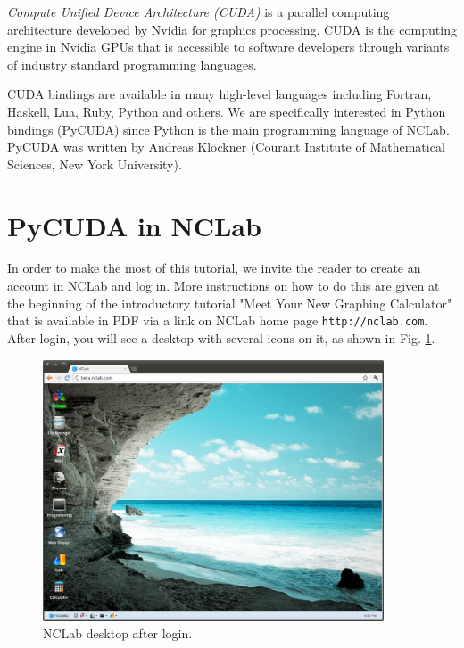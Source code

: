 \documentclass{article}
\begin{document}
{\em Compute Unified Device Architecture (CUDA)} is a parallel computing architecture 
developed by Nvidia for graphics processing. CUDA is the computing engine in 
Nvidia GPUs that is accessible to software developers through variants of 
industry standard programming languages.

CUDA bindings are available in many high-level languages including Fortran,
Haskell, Lua, Ruby, Python and others. We are specifically interested 
in Python bindings (PyCUDA) since Python is the main programming language 
of NCLab. PyCUDA was written by Andreas Kl\"ockner (Courant Institute 
of Mathematical Sciences, New York University).





\section{PyCUDA in NCLab}

In order to make the most of this tutorial, we invite the 
reader to create an account in NCLab and log in. More instructions 
on how to do this are given at the beginning of the introductory 
tutorial "Meet Your New Graphing Calculator" that is available in 
PDF via a link on NCLab home page {\tt http://nclab.com}. \\

\noindent
After login, you will see a desktop with several icons on it,
as shown in Fig. \ref{fig:desktop}. 

\begin{figure}[!ht]
\begin{center}
\includegraphics[width=0.9\textwidth]{img/desktop.png}
\end{center}
\caption{NCLab desktop after login.}
\label{fig:desktop}
\end{figure}
\end{document}
